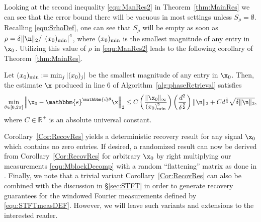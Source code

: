 Looking at the second inequality \eqref{equ:ManRes2} in Theorem~\ref{thm:MainRes} we can see that the error bound there will be vacuous in most settings unless $S_\rho = \emptyset$.  Recalling \eqref{equ:SrhoDef}, one can see that $S_\rho$ will be empty as soon as $\rho = \delta \| \n \|_2 / \left| (x_0)_{\rm min} \right|^4$, where $(x_0)_{\rm min}$ is the smallest magnitude of any entry in $\x_0$.  Utilizing this value of $\rho$ in \eqref{equ:ManRes2} leads to the following corollary of Theorem~\ref{thm:MainRes}.

\begin{cor}
Let $(x_0)_{\rm min} := \min_j |(x_0)_j|$ be the smallest magnitude of any entry in $\x_0$.  Then, the estimate $\x$ produced in line 6 of Algorithm~\ref{alg:phaseRetrieval} satisfies 
\[ \min_{\theta \in [0, 2 \pi]} \left\Vert  \x_0 - \mathbbm{e}^{\mathbbm{i} \theta} \x \right\Vert_2 \leq C \left( \frac{\Vert \x_0 
        \Vert_{\infty}}{(x_0)^2_{\rm min}} \right) \left( \frac{d^{2}}{\delta^{\frac{3}{2}}} \right) \| \n \|_2 + C d^{\frac{1}{4}} \sqrt{\delta \| \n \|_2 },\]
where $C \in \mathbb{R}^+$ is an absolute universal constant.  
\label{Cor:RecovRes}
\end{cor}

Corollary~\ref{Cor:RecovRes} yields a deterministic recovery result for any signal $\x_0$ which contains no zero entries.  If desired, a randomized result can now be derived from Corollary~\ref{Cor:RecovRes} for arbitrary $\x_0$ by right multiplying our measurements \eqref{equ:MblockDecomp} with a random ``flattening'' matrix as done in \cite{IVW2015_FastPhase}.  Finally, we note that a trivial variant Corollary~\ref{Cor:RecovRes} can also be combined with the discussion in \S \ref{sec:STFT} in order to generate recovery guarantees for the windowed Fourier measurements defined by \eqref{equ:STFTmeasDEF}.  However, we will leave such variants and extensions to the interested reader.


